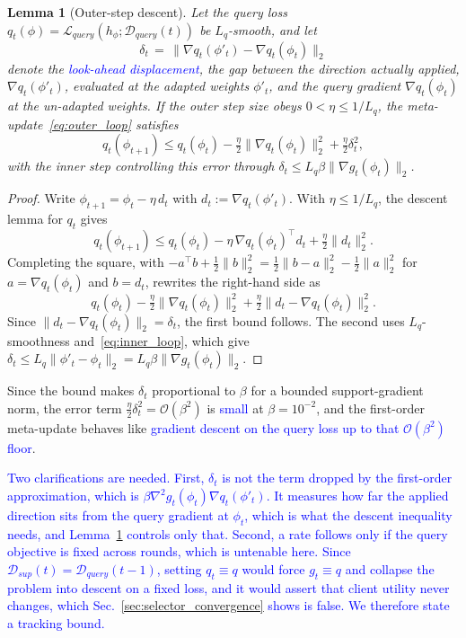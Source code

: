 \documentclass[journal]{IEEEtran}
\newtheorem{Lemma}{Lemma}
\theoremstyle{remark}
\newcommand{\revtwo}[1]{\textcolor{blue}{#1}}
\begin{document}
{\color{black}
\begin{Lemma}[Outer-step descent]\label{stmt:outer}
Let the query loss $q_t(\phi)=\mathcal{L}_{query}(h_\phi;\mathcal{D}_{query}(t))$ be $L_q$-smooth, and let
\[
\delta_t\,=\,\lVert\nabla q_t(\phi'_t)-\nabla q_t(\phi_t)\rVert_2
\]
denote the \revtwo{\emph{look-ahead displacement}}, the gap between the direction actually applied, $\nabla q_t(\phi'_t)$, evaluated at the adapted weights $\phi'_t$, and the query gradient $\nabla q_t(\phi_t)$ at the un-adapted weights. If the outer step size obeys $0<\eta\le 1/L_q$, the meta-update~\eqref{eq:outer_loop} satisfies
\[
q_t(\phi_{t+1})\le q_t(\phi_t)-\tfrac{\eta}{2}\lVert\nabla q_t(\phi_t)\rVert_2^2+\tfrac{\eta}{2}\delta_t^2 ,
\]
with the inner step controlling this error through $\delta_t\le L_q\beta\lVert\nabla g_t(\phi_t)\rVert_2$.
\end{Lemma}
\begin{proof}
Write $\phi_{t+1}=\phi_t-\eta\,d_t$ with $d_t:=\nabla q_t(\phi'_t)$. With $\eta\le 1/L_q$, the descent lemma for $q_t$ gives
\[
q_t(\phi_{t+1})\le q_t(\phi_t)-\eta\,\nabla q_t(\phi_t)^{\top}d_t+\tfrac{\eta}{2}\lVert d_t\rVert_2^2 .
\]
Completing the square, with $-a^{\top}b+\tfrac12\lVert b\rVert_2^2=\tfrac12\lVert b-a\rVert_2^2-\tfrac12\lVert a\rVert_2^2$ for $a=\nabla q_t(\phi_t)$ and $b=d_t$, rewrites the right-hand side as
\[
q_t(\phi_t)-\tfrac{\eta}{2}\lVert\nabla q_t(\phi_t)\rVert_2^2+\tfrac{\eta}{2}\lVert d_t-\nabla q_t(\phi_t)\rVert_2^2 .
\]
Since $\lVert d_t-\nabla q_t(\phi_t)\rVert_2=\delta_t$, the first bound follows. The second uses $L_q$-smoothness and~\eqref{eq:inner_loop}, which give $\delta_t\le L_q\lVert\phi'_t-\phi_t\rVert_2=L_q\beta\lVert\nabla g_t(\phi_t)\rVert_2$.
\end{proof}
Since the bound makes $\delta_t$ proportional to $\beta$ for a bounded support-gradient norm, the error term $\tfrac{\eta}{2}\delta_t^2=\mathcal{O}(\beta^2)$ is \revtwo{small} at $\beta=10^{-2}$, and the first-order meta-update behaves like \revtwo{gradient descent on the query loss up to that $\mathcal{O}(\beta^2)$ floor}.

\revtwo{Two clarifications are needed. First, $\delta_t$ is not the term dropped by the first-order approximation, which is $\beta\nabla^2 g_t(\phi_t)\nabla q_t(\phi'_t)$. It measures how far the applied direction sits from the query gradient at $\phi_t$, which is what the descent inequality needs, and Lemma~\ref{stmt:outer} controls only that. Second, a rate follows only if the query objective is fixed across rounds, which is untenable here. Since $\mathcal{D}_{sup}(t)=\mathcal{D}_{query}(t-1)$, setting $q_t\equiv q$ would force $g_t\equiv q$ and collapse the problem into descent on a fixed loss, and it would assert that client utility never changes, which Sec.~\ref{sec:selector_convergence} shows is false. We therefore state a tracking bound.}

}
\end{document}
